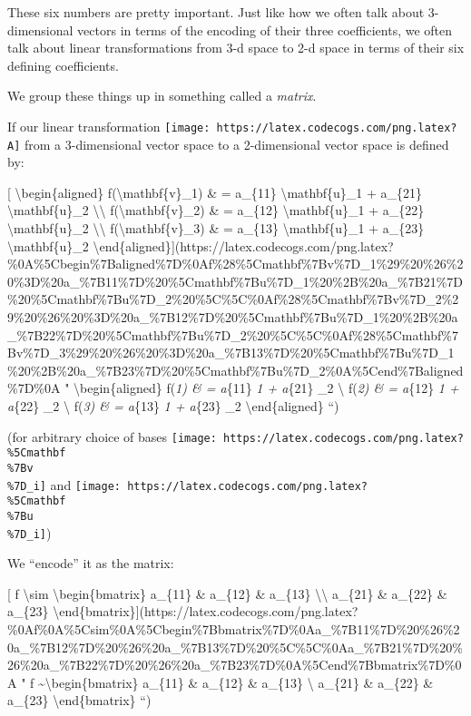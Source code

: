 \documentclass[]{article}
\begin{document}
These six numbers are pretty important. Just like how we often talk about
3-dimensional vectors in terms of the encoding of their three coefficients, we
often talk about linear transformations from 3-d space to 2-d space in terms of
their six defining coefficients.

We group these things up in something called a \emph{matrix}.

If our linear transformation
\texttt{[image: https://latex.codecogs.com/png.latex?A]} from a 3-dimensional
vector space to a 2-dimensional vector space is defined by:

{[} \textbackslash{}begin\{aligned\} f(\textbackslash{}mathbf\{v\}\_1) \& =
a\_\{11\} \textbackslash{}mathbf\{u\}\_1 + a\_\{21\}
\textbackslash{}mathbf\{u\}\_2 \textbackslash{}\textbackslash{}
f(\textbackslash{}mathbf\{v\}\_2) \& = a\_\{12\} \textbackslash{}mathbf\{u\}\_1
+ a\_\{22\} \textbackslash{}mathbf\{u\}\_2 \textbackslash{}\textbackslash{}
f(\textbackslash{}mathbf\{v\}\_3) \& = a\_\{13\} \textbackslash{}mathbf\{u\}\_1
+ a\_\{23\} \textbackslash{}mathbf\{u\}\_2
\textbackslash{}end\{aligned\}{]}(https://latex.codecogs.com/png.latex?\%0A\%5Cbegin\%7Baligned\%7D\%0Af\%28\%5Cmathbf\%7Bv\%7D\_1\%29\%20\%26\%20\%3D\%20a\_\%7B11\%7D\%20\%5Cmathbf\%7Bu\%7D\_1\%20\%2B\%20a\_\%7B21\%7D\%20\%5Cmathbf\%7Bu\%7D\_2\%20\%5C\%5C\%0Af\%28\%5Cmathbf\%7Bv\%7D\_2\%29\%20\%26\%20\%3D\%20a\_\%7B12\%7D\%20\%5Cmathbf\%7Bu\%7D\_1\%20\%2B\%20a\_\%7B22\%7D\%20\%5Cmathbf\%7Bu\%7D\_2\%20\%5C\%5C\%0Af\%28\%5Cmathbf\%7Bv\%7D\_3\%29\%20\%26\%20\%3D\%20a\_\%7B13\%7D\%20\%5Cmathbf\%7Bu\%7D\_1\%20\%2B\%20a\_\%7B23\%7D\%20\%5Cmathbf\%7Bu\%7D\_2\%0A\%5Cend\%7Baligned\%7D\%0A
" \textbackslash{}begin\{aligned\} f(\emph{1) \& = a}\{11\}
\emph{1 + a}\{21\} \_2 \textbackslash{} f(\emph{2)
\& = a}\{12\} \emph{1 + a}\{22\} \_2 \textbackslash{}
f(\emph{3) \& = a}\{13\} \emph{1 + a}\{23\} \_2
\textbackslash{}end\{aligned\} ``)

(for arbitrary choice of bases
\texttt{[image: https://latex.codecogs.com/png.latex?\\\%5Cmathbf\\\%7Bv\\\%7D\_i]} and
\texttt{[image: https://latex.codecogs.com/png.latex?\\\%5Cmathbf\\\%7Bu\\\%7D\_i]})

We ``encode'' it as the matrix:

{[} f \textbackslash{}sim \textbackslash{}begin\{bmatrix\} a\_\{11\} \&
a\_\{12\} \& a\_\{13\} \textbackslash{}\textbackslash{} a\_\{21\} \& a\_\{22\}
\& a\_\{23\}
\textbackslash{}end\{bmatrix\}{]}(https://latex.codecogs.com/png.latex?\%0Af\%0A\%5Csim\%0A\%5Cbegin\%7Bbmatrix\%7D\%0Aa\_\%7B11\%7D\%20\%26\%20a\_\%7B12\%7D\%20\%26\%20a\_\%7B13\%7D\%20\%5C\%5C\%0Aa\_\%7B21\%7D\%20\%26\%20a\_\%7B22\%7D\%20\%26\%20a\_\%7B23\%7D\%0A\%5Cend\%7Bbmatrix\%7D\%0A
" f \sim \textbackslash{}begin\{bmatrix\} a\_\{11\} \& a\_\{12\} \& a\_\{13\}
\textbackslash{} a\_\{21\} \& a\_\{22\} \& a\_\{23\}
\textbackslash{}end\{bmatrix\} ``)
\end{document}
